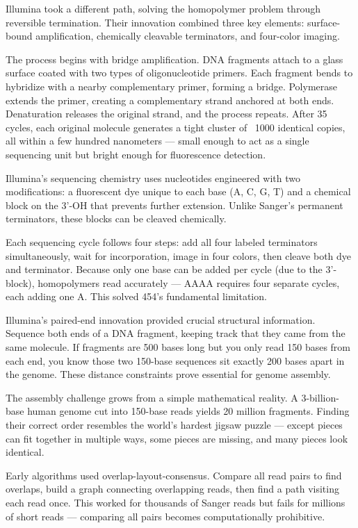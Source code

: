 Illumina took a different path, solving the homopolymer problem through reversible termination. Their innovation combined three key elements: surface-bound amplification, chemically cleavable terminators, and four-color imaging.

The process begins with bridge amplification. DNA fragments attach to a glass surface coated with two types of oligonucleotide primers. Each fragment bends to hybridize with a nearby complementary primer, forming a bridge. Polymerase extends the primer, creating a complementary strand anchored at both ends. Denaturation releases the original strand, and the process repeats. After 35 cycles, each original molecule generates a tight cluster of ~1000 identical copies, all within a few hundred nanometers — small enough to act as a single sequencing unit but bright enough for fluorescence detection.

Illumina's sequencing chemistry uses nucleotides engineered with two modifications: a fluorescent dye unique to each base (A, C, G, T) and a chemical block on the 3'-OH that prevents further extension. Unlike Sanger's permanent terminators, these blocks can be cleaved chemically.

Each sequencing cycle follows four steps: add all four labeled terminators simultaneously, wait for incorporation, image in four colors, then cleave both dye and terminator. Because only one base can be added per cycle (due to the 3'-block), homopolymers read accurately — AAAA requires four separate cycles, each adding one A. This solved 454's fundamental limitation.

Illumina's paired-end innovation provided crucial structural information. Sequence both ends of a DNA fragment, keeping track that they came from the same molecule. If fragments are 500 bases long but you only read 150 bases from each end, you know those two 150-base sequences sit exactly 200 bases apart in the genome. These distance constraints prove essential for genome assembly.

The assembly challenge grows from a simple mathematical reality. A 3-billion-base human genome cut into 150-base reads yields 20 million fragments. Finding their correct order resembles the world's hardest jigsaw puzzle — except pieces can fit together in multiple ways, some pieces are missing, and many pieces look identical.

Early algorithms used overlap-layout-consensus. Compare all read pairs to find overlaps, build a graph connecting overlapping reads, then find a path visiting each read once. This worked for thousands of Sanger reads but fails for millions of short reads — comparing all pairs becomes computationally prohibitive.

